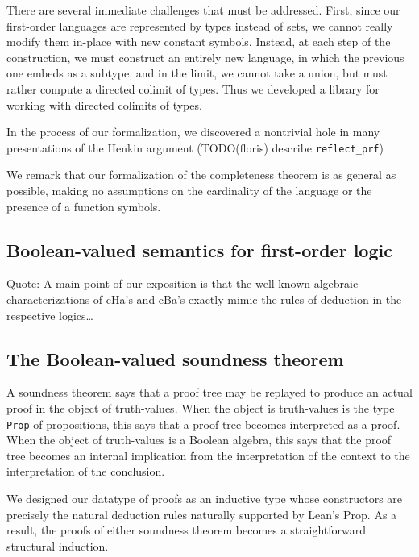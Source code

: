 \documentclass[a4paper,USenglish,cleveref, autoref]{lipics-v2019}
\begin{document}
There are several immediate challenges that must be addressed. First, since our first-order languages are represented by types instead of sets, we cannot really modify them in-place with new constant symbols. Instead, at each step of the construction, we must construct an entirely new language, in which the previous one embeds as a subtype, and in the limit, we cannot take a union, but must rather compute a directed colimit of types. Thus we developed a library for working with directed colimits of types.

In the process of our formalization, we discovered a nontrivial hole in many presentations of the Henkin argument (TODO(floris) describe \lstinline{reflect_prf})

We remark that our formalization of the completeness theorem is as general as possible, making no assumptions on the cardinality of the language or the presence of a function symbols.

\subsection{Boolean-valued semantics for first-order logic}


Quote: %
  A main point of our exposition is that the
  well-known algebraic characterizations of cHa’s and cBa’s exactly mimic the rules of
  deduction in the respective logics\ldots{}

\subsection{The Boolean-valued soundness theorem}

A soundness theorem says that a proof tree may be replayed to produce an actual proof in the object of truth-values. When the object is truth-values is the type \texttt{Prop} of propositions, this says that a proof tree becomes interpreted as a proof. When the object of truth-values is a Boolean algebra, this says that the proof tree becomes an internal implication from the interpretation of the context to the interpretation of the conclusion.

We designed our datatype of proofs as an inductive type whose constructors are precisely the natural deduction rules naturally supported by Lean's Prop. As a result, the proofs of either soundness theorem becomes a straightforward structural induction.
\end{document}
